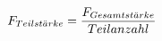 \documentclass[preview]{standalone}
\begin{document}
\begin{align*}
\special{dvisvgm:raw <g id='unique000'>}F_{Teilst \ddot{a} rke} = \frac{F_{Gesamtst \ddot{a} rke}} {Teilanzahl}\special{dvisvgm:raw </g>}
\end{align*}
\end{document}
